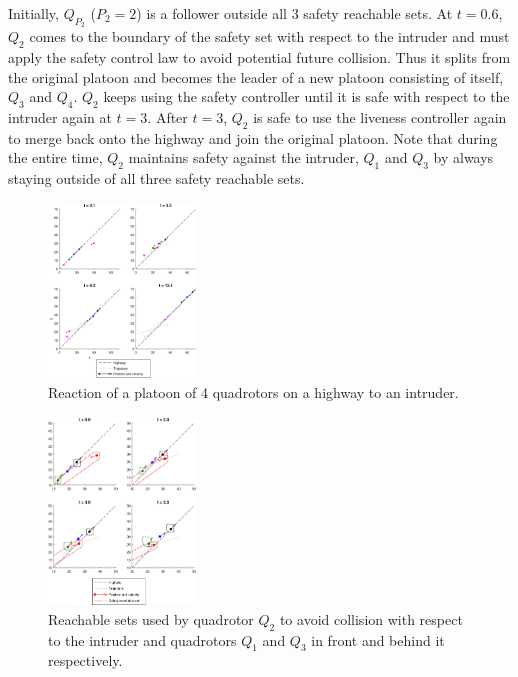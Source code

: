 Initially, $Q_{P_2}$ ($P_2=2$) is a follower outside all 3 safety reachable sets. At $t=0.6$, $Q_2$ comes to the boundary of the safety set with respect to the intruder and must apply the safety control law to avoid potential future collision. Thus it splits from the original platoon and becomes the leader of a new platoon consisting of itself, $Q_3$ and $Q_4$. $Q_2$ keeps using the safety controller until it is safe with respect to the intruder again at $t=3$. After $t=3$, $Q_2$ is safe to use the liveness controller again to merge back onto the highway and join the original platoon. Note that during the entire time, $Q_2$ maintains safety against the intruder, $Q_1$ and $Q_3$ by always staying outside of all three safety reachable sets.


\begin{figure}
	\centering
	\includegraphics[width=0.35\textwidth]{"fig/Intruder1"}
	\caption{Reaction of a platoon of 4 quadrotors on a highway to an intruder.}
	\label{fig:intruder1}
\end{figure}

\begin{figure}
	\centering
		\includegraphics[width=0.35\textwidth]{"fig/intruder2"}
	\caption{Reachable sets used by quadrotor $Q_2$ to avoid collision with respect to the intruder and quadrotors $Q_1$ and $Q_3$ in front and behind it respectively.}
	\label{fig:intruder2}
\end{figure}


